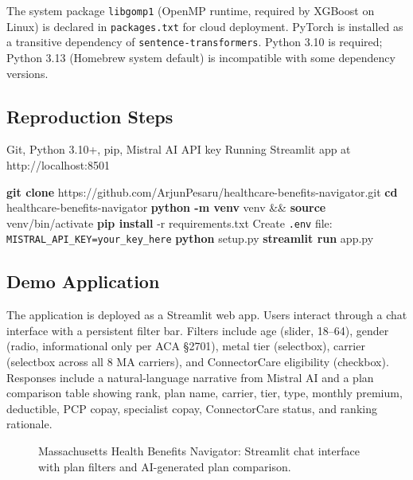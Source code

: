 \documentclass[12pt, letterpaper]{article}
\newenvironment{pseudoblock}[1]{%
  \begin{mdframed}[
    backgroundcolor=pseudobg,
    linecolor=pseudoframe,
    linewidth=1.5pt,
    frametitle={\color{pseudoframe}\bfseries\small Pseudo-code: #1},
    frametitlebackgroundcolor=pseudoframe!15
  ]
  \begin{algorithmic}[1]
}{%
  \end{algorithmic}
  \end{mdframed}
}
\begin{document}
The system package \texttt{libgomp1} (OpenMP runtime, required by XGBoost on Linux) is declared in \texttt{packages.txt} for cloud deployment. PyTorch is installed as a transitive dependency of \texttt{sentence-transformers}. Python 3.10 is required; Python 3.13 (Homebrew system default) is incompatible with some dependency versions.

\subsection{Reproduction Steps}

\begin{pseudoblock}{Reproduction Procedure}
\REQUIRE Git, Python 3.10+, pip, Mistral AI API key
\ENSURE Running Streamlit app at http://localhost:8501

\STATE \textbf{git clone} https://github.com/ArjunPesaru/healthcare-benefits-navigator.git
\STATE \textbf{cd} healthcare-benefits-navigator
\STATE \textbf{python -m venv} venv \&\& \textbf{source} venv/bin/activate
\STATE \textbf{pip install} -r requirements.txt
\STATE Create \texttt{.env} file: \texttt{MISTRAL\_API\_KEY=your\_key\_here}
\STATE \textbf{python} setup.py   
\STATE \textbf{streamlit run} app.py  
\end{pseudoblock}

\subsection{Demo Application}

The application is deployed as a Streamlit web app. Users interact through a chat interface with a persistent filter bar. Filters include age (slider, 18--64), gender (radio, informational only per ACA \S2701), metal tier (selectbox), carrier (selectbox across all 8 MA carriers), and ConnectorCare eligibility (checkbox). Responses include a natural-language narrative from Mistral AI and a plan comparison table showing rank, plan name, carrier, tier, type, monthly premium, deductible, PCP copay, specialist copay, ConnectorCare status, and ranking rationale.

\begin{figure}[H]
  \centering
  \caption{Massachusetts Health Benefits Navigator: Streamlit chat interface with plan filters and AI-generated plan comparison.}
  \label{fig:demo}
\end{figure}
\end{document}
